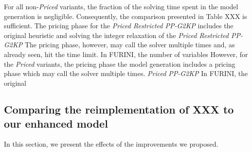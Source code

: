 \documentclass[smallextended]{svjour3}       %
\begin{document}
For all non-\emph{Priced} variants, the fraction of the solving time spent in the model generation is negligible.
Consequently, the comparison presented in Table XXX is sufficient.
The pricing phase for the \emph{Priced Restricted PP-G2KP} includes the original heuristic and solving the integer relaxation of the \emph{Priced Restricted PP-G2KP} 
The pricing phase, however, may call the solver multiple times and, as already seen, hit the time limit.
In FURINI, the number of variables 
However, for the \emph{Priced} variants, the pricing phase 
the model generation includes a pricing phase which may call the solver multiple times.
\emph{Priced PP-G2KP} 
In FURINI, the original 

\subsection{Comparing the reimplementation of XXX to our enhanced model}

In this section, we present the effects of the improvements we proposed.



\end{document}
